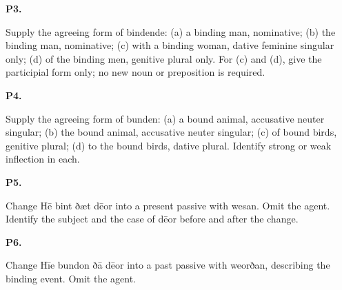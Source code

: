 \par\begin{minipage}{\linewidth}\raggedright
\textbf{P3.}

Supply the agreeing form of bindende: (a) a binding man, nominative; (b) the binding man, nominative; (c) with a binding woman, dative feminine singular only; (d) of the binding men, genitive plural only. For (c) and (d), give the participial form only; no new noun or preposition is required.

\end{minipage}\par\addvspace{4pt}

\par\begin{minipage}{\linewidth}\raggedright
\textbf{P4.}

Supply the agreeing form of bunden: (a) a bound animal, accusative neuter singular; (b) the bound animal, accusative neuter singular; (c) of bound birds, genitive plural; (d) to the bound birds, dative plural. Identify strong or weak inflection in each.

\end{minipage}\par\addvspace{4pt}

\par\begin{minipage}{\linewidth}\raggedright
\textbf{P5.}

Change Hē bint ðæt dēor into a present passive with wesan. Omit the agent. Identify the subject and the case of dēor before and after the change.

\end{minipage}\par\addvspace{4pt}

\par\begin{minipage}{\linewidth}\raggedright
\textbf{P6.}

Change Hīe bundon ðā dēor into a past passive with weorðan, describing the binding event. Omit the agent.

\end{minipage}\par\addvspace{4pt}

